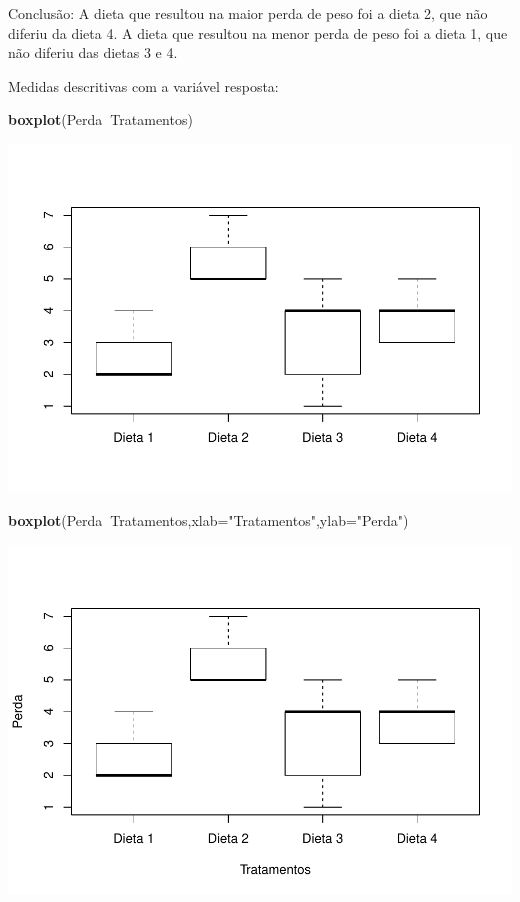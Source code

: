 \documentclass[12pt,brazil,]{book}
\newenvironment{Shaded}{\begin{snugshade}}{\end{snugshade}}
\newcommand{\DataTypeTok}[1]{\textcolor[rgb]{0.13,0.29,0.53}{#1}}
\newcommand{\KeywordTok}[1]{\textcolor[rgb]{0.13,0.29,0.53}{\textbf{#1}}}
\newcommand{\NormalTok}[1]{#1}
\newcommand{\OperatorTok}[1]{\textcolor[rgb]{0.81,0.36,0.00}{\textbf{#1}}}
\newcommand{\StringTok}[1]{\textcolor[rgb]{0.31,0.60,0.02}{#1}}
\begin{document}
Conclusão: A dieta que resultou na maior perda de peso foi a dieta 2,
que não diferiu da dieta 4. A dieta que resultou na menor perda de peso
foi a dieta 1, que não diferiu das dietas 3 e 4.

Medidas descritivas com a variável resposta:

\begin{Shaded}
\begin{Highlighting}[]
\KeywordTok{boxplot}\NormalTok{(Perda}\OperatorTok{~}\NormalTok{Tratamentos)}
\end{Highlighting}
\end{Shaded}

\includegraphics{02-Delinexp_files/figure-latex/unnamed-chunk-11-1.pdf}

\begin{Shaded}
\begin{Highlighting}[]
\KeywordTok{boxplot}\NormalTok{(Perda}\OperatorTok{~}\NormalTok{Tratamentos,}\DataTypeTok{xlab=}\StringTok{"Tratamentos"}\NormalTok{,}\DataTypeTok{ylab=}\StringTok{"Perda"}\NormalTok{)}
\end{Highlighting}
\end{Shaded}

\includegraphics{02-Delinexp_files/figure-latex/unnamed-chunk-12-1.pdf}
\end{document}

